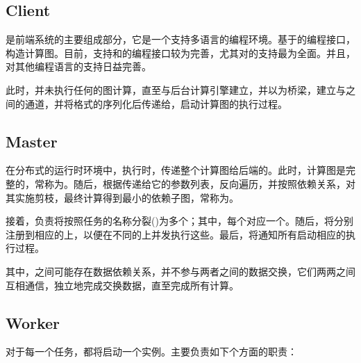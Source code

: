 \begin{content}
\subsection{Client}

是前端系统的主要组成部分，它是一个支持多语言的编程环境。基于的编程接口，构造计算图。目前，支持和的编程接口较为完善，尤其对的支持最为全面。并且，对其他编程语言的支持日益完善。

此时，并未执行任何的图计算，直至与后台计算引擎建立，并以为桥梁，建立与之间的通道，并将格式的序列化后传递给，启动计算图的执行过程。

\subsection{Master}

在分布式的运行时环境中，执行时，传递整个计算图给后端的。此时，计算图是完整的，常称为\emph{}。随后，根据传递给它的参数列表，反向遍历，并按照依赖关系，对其实施剪枝，最终计算得到最小的依赖子图，常称为。

接着，负责将按照任务的名称分裂()为多个；其中，每个对应一个。随后，将分别注册到相应的上，以便在不同的上并发执行这些。最后，将通知所有启动相应的执行过程。

其中，之间可能存在数据依赖关系，并不参与两者之间的数据交换，它们两两之间互相通信，独立地完成交换数据，直至完成所有计算。

\subsection{Worker}

对于每一个任务，\tf{}都将启动一个实例。主要负责如下个方面的职责：

\begin{enum}
\end{enum}


\end{content}
